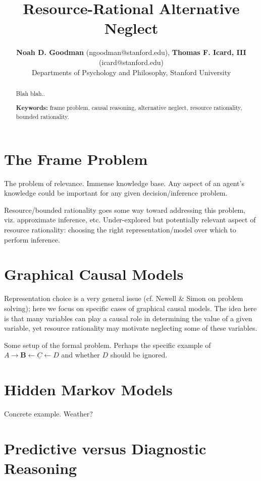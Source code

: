 \documentclass[10pt,letterpaper]{article}
\title{Resource-Rational Alternative Neglect}
\author{{\large \bf Noah D. Goodman} (ngoodman@stanford.edu), {\large \bf Thomas F. Icard, III} (icard@stanford.edu) \\
  Departments of Psychology and Philosophy, Stanford University}
\begin{document}
\maketitle


\begin{abstract}
Blah blah..

\textbf{Keywords:} 
frame problem, causal reasoning, alternative neglect, resource rationality, bounded rationality.
\end{abstract}

\section{The Frame Problem}

The problem of relevance. Immense knowledge base. Any aspect of an agent's knowledge could be important for any given decision/inference problem.

Resource/bounded rationality goes some way toward addressing this problem, viz. approximate inference, etc. Under-explored but potentially relevant aspect of resource rationality: choosing the right representation/model over which to perform inference.

\section{Graphical Causal Models}

Representation choice is a very general issue (cf. Newell \& Simon on problem solving); here we focus on specific cases of graphical causal models. The idea here is that many variables can play a causal role in determining the value of a given variable, yet resource rationality may motivate neglecting some of these variables.

Some setup of the formal problem. Perhaps the specific example of $A\rightarrow \textbf{B}\leftarrow \underline{C} \leftarrow D$ and whether $D$ should be ignored. 

\section{Hidden Markov Models}

Concrete example. Weather?

\section{Predictive versus Diagnostic Reasoning}
\end{document}
